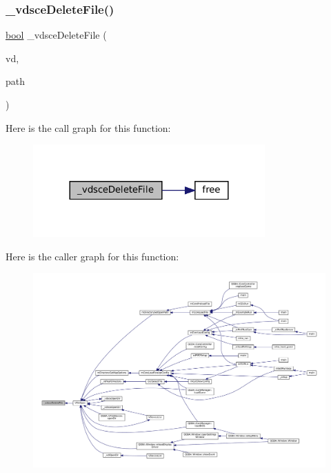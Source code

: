 \subsubsection{\texorpdfstring{\+\_\+vdsce\+Delete\+File()}{\_vdsceDeleteFile()}}
{\footnotesize\ttfamily \mbox{\hyperlink{libretro_8h_a4a26dcae73fb7e1528214a068aca317e}{bool}} \+\_\+vdsce\+Delete\+File (\begin{DoxyParamCaption}\item[{struct V\+Dir $\ast$}]{vd,  }\item[{const char $\ast$}]{path }\end{DoxyParamCaption})\hspace{0.3cm}{\ttfamily [static]}}

Here is the call graph for this function\+:
\nopagebreak
\begin{figure}[H]
\begin{center}
\leavevmode
\includegraphics[width=252pt]{sce-vfs_8c_aaceb97860f376368fc9ba409a19ede70_cgraph}
\end{center}
\end{figure}
Here is the caller graph for this function\+:
\nopagebreak
\begin{figure}[H]
\begin{center}
\leavevmode
\includegraphics[width=350pt]{sce-vfs_8c_aaceb97860f376368fc9ba409a19ede70_icgraph}
\end{center}
\end{figure}
\mbox{\label{sce-vfs_8c_a57e973c17c5a3b2598161d56e3f778e3}} 

